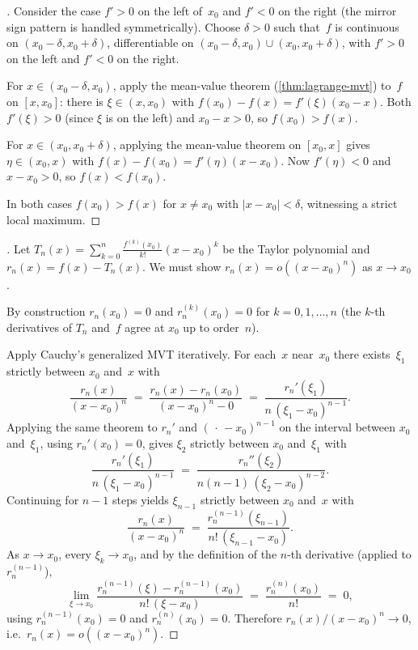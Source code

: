 \begin{proof}[]
Consider the case $f' > 0$ on the left of~$x_0$ and $f' < 0$ on the
right (the mirror sign pattern is handled symmetrically). Choose
$\delta > 0$ such that~$f$ is continuous on $(x_0 - \delta, x_0 + \delta)$,
differentiable on $(x_0 - \delta, x_0) \cup (x_0, x_0 + \delta)$, with
$f' > 0$ on the left and $f' < 0$ on the right.

For $x \in (x_0 - \delta, x_0)$, apply the mean-value theorem
(\cref{thm:lagrange-mvt}) to~$f$ on $[x, x_0]$: there is
$\xi \in (x, x_0)$ with $f(x_0) - f(x) = f'(\xi)(x_0 - x)$. Both
$f'(\xi) > 0$ (since $\xi$ is on the left) and $x_0 - x > 0$, so
$f(x_0) > f(x)$.

For $x \in (x_0, x_0 + \delta)$, applying the mean-value theorem on
$[x_0, x]$ gives $\eta \in (x_0, x)$ with $f(x) - f(x_0) = f'(\eta)(x - x_0)$.
Now $f'(\eta) < 0$ and $x - x_0 > 0$, so $f(x) < f(x_0)$.

In both cases $f(x_0) > f(x)$ for $x \neq x_0$ with $|x - x_0| < \delta$,
witnessing a strict local maximum.
\end{proof}

\begin{proof}[]
Let $T_n(x) = \sum_{k=0}^{n} \frac{f^{(k)}(x_0)}{k!} (x - x_0)^k$ be
the Taylor polynomial and $r_n(x) = f(x) - T_n(x)$. We must show
$r_n(x) = o((x - x_0)^n)$ as $x \to x_0$.

By construction $r_n(x_0) = 0$ and $r_n^{(k)}(x_0) = 0$ for
$k = 0, 1, \dots, n$ (the $k$-th derivatives of $T_n$ and~$f$
agree at $x_0$ up to order~$n$).

Apply Cauchy's generalized MVT iteratively. For each~$x$ near~$x_0$
there exists~$\xi_1$ strictly between $x_0$ and~$x$ with
\[
  \frac{r_n(x)}{(x - x_0)^n}
  \;=\; \frac{r_n(x) - r_n(x_0)}{(x - x_0)^n - 0}
  \;=\; \frac{r_n'(\xi_1)}{n\,(\xi_1 - x_0)^{n-1}}.
\]
Applying the same theorem to $r_n'$ and $(\,\cdot\, - x_0)^{n-1}$ on
the interval between $x_0$ and~$\xi_1$, using $r_n'(x_0) = 0$, gives
$\xi_2$ strictly between $x_0$ and~$\xi_1$ with
\[
  \frac{r_n'(\xi_1)}{n\,(\xi_1 - x_0)^{n-1}}
  \;=\; \frac{r_n''(\xi_2)}{n(n-1)\,(\xi_2 - x_0)^{n-2}}.
\]
Continuing for $n - 1$ steps yields $\xi_{n-1}$ strictly between
$x_0$ and~$x$ with
\[
  \frac{r_n(x)}{(x - x_0)^n}
  \;=\; \frac{r_n^{(n-1)}(\xi_{n-1})}{n!\,(\xi_{n-1} - x_0)}.
\]
As $x \to x_0$, every $\xi_k \to x_0$, and by the definition of the
$n$-th derivative (applied to $r_n^{(n-1)}$),
\[
  \lim_{\xi \to x_0} \frac{r_n^{(n-1)}(\xi) - r_n^{(n-1)}(x_0)}{n!\,(\xi - x_0)}
  \;=\; \frac{r_n^{(n)}(x_0)}{n!} \;=\; 0,
\]
using $r_n^{(n-1)}(x_0) = 0$ and $r_n^{(n)}(x_0) = 0$.
Therefore $r_n(x)/(x - x_0)^n \to 0$, i.e.\ $r_n(x) = o((x - x_0)^n)$.
\end{proof}


